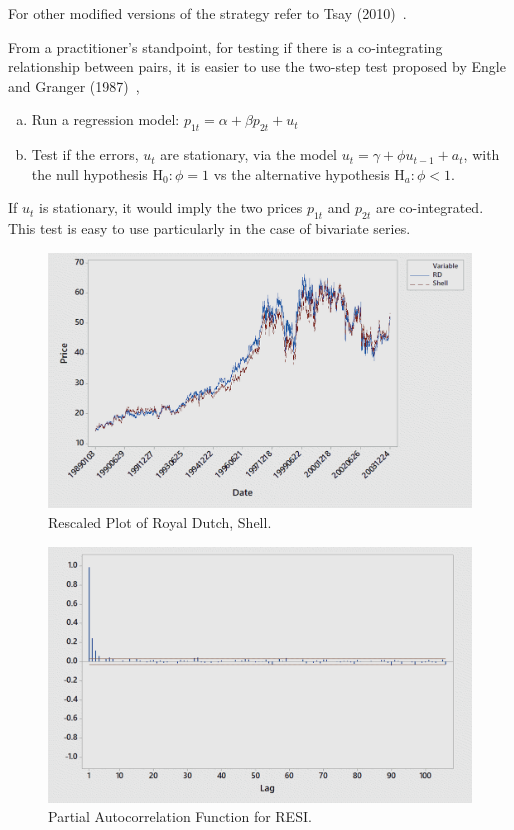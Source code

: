 \noindent For other modified versions of the strategy refer to Tsay (2010)~\cite[Section 8.8]{tsay}.


From a practitioner's standpoint, for testing if there is a co-integrating relationship between pairs, it is easier to use the two-step test proposed by Engle and Granger (1987)~\cite{engle1987co},
        \begin{enumerate}[(a)]
        \item Run a regression model: $p_{1t}= \alpha + \beta p_{2t} + u_t$
        \item Test if the errors, $u_t$ are stationary, via the model $u_t=\gamma + \phi u_{t-1} + a_t$, with the null hypothesis $\text{H}_0: \phi= 1$ vs  the alternative hypothesis $\text{H}_a: \phi<1$.
        \end{enumerate}
If $u_t$ is stationary, it would imply the two prices $p_{1t}$ and $p_{2t}$ are co-integrated. This test is easy to use particularly in the case of bivariate series.

	\begin{figure}[!ht]
	\centering
	\includegraphics[width=\textwidth]{chapters/chapter_stat_ts/figures/rds.png}
	\caption{Rescaled Plot of Royal Dutch, Shell. \label{fig:rds}}
	\end{figure}
	
	\begin{figure}[!ht]
	\centering
	\includegraphics[width=\textwidth]{chapters/chapter_stat_ts/figures/pafresi.png}
	\caption{Partial Autocorrelation Function for RESI. \label{fig:pafresi}}
	\end{figure}
	

